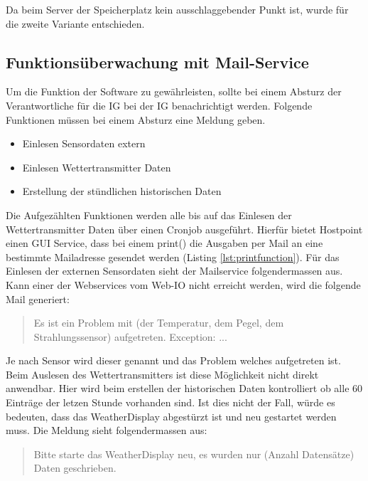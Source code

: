 Da beim Server der Speicherplatz kein ausschlaggebender Punkt ist, wurde für die zweite Variante entschieden.



\subsection{Funktionsüberwachung mit Mail-Service}\label{kap:Funktionsüberwachung}
Um die Funktion der Software zu gewährleisten, sollte bei einem Absturz der Verantwortliche für die IG bei der IG benachrichtigt werden. Folgende Funktionen müssen bei einem Absturz eine Meldung geben.
\begin{itemize}
\item Einlesen Sensordaten extern
\item Einlesen Wettertransmitter Daten
\item Erstellung der stündlichen historischen Daten
\end{itemize}
Die Aufgezählten Funktionen werden alle bis auf das Einlesen der Wettertransmitter Daten über einen Cronjob ausgeführt. Hierfür bietet Hostpoint einen GUI Service, dass bei einem print() die Ausgaben per Mail an eine bestimmte Mailadresse gesendet werden (Listing \ref{lst:printfunction}). Für das Einlesen der externen Sensordaten sieht der Mailservice folgendermassen aus. Kann einer der Webservices vom Web-IO nicht erreicht werden, wird die folgende Mail generiert:\\
\begin{quote}
Es ist ein Problem mit (der Temperatur, dem Pegel, dem Strahlungssensor) aufgetreten. Exception: ...\\
\end{quote}
Je nach Sensor wird dieser genannt und das Problem welches aufgetreten ist. Beim Auslesen des Wettertransmitters ist diese Möglichkeit nicht direkt anwendbar. Hier wird beim erstellen der historischen Daten kontrolliert ob alle 60 Einträge der letzen Stunde vorhanden sind. Ist dies nicht der Fall, würde es bedeuten, dass das WeatherDisplay abgestürzt ist und neu gestartet werden muss. Die Meldung sieht folgendermassen aus:\\
\begin{quote}
Bitte starte das WeatherDisplay neu, es wurden nur (Anzahl Datensätze) Daten geschrieben.
\end{quote}

